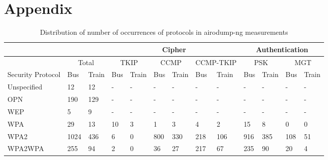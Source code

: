 \documentclass[letterpaper, 10 pt, conference]{ieeeconf}  %
\begin{document}
\section{Appendix}
\begin{center}
  \begin{table} [htbp]
   \centering
    \begin{tabular}{ |l|l|l|l|l|l|l|l|l|l|l|l|l| }
    \hline    
    {} & \multicolumn{2}{|c|}{} & \multicolumn{6}{|c|}{Cipher} & \multicolumn{4}{|c|}{Authentication} \\ \hline
    {} & \multicolumn{2}{|c|}{Total} & \multicolumn{2}{|c|}{TKIP} & \multicolumn{2}{|c|}{CCMP} & \multicolumn{2}{|c|}{CCMP-TKIP} & \multicolumn{2}{|c|}{PSK} & \multicolumn{2}{|c|}{MGT} \\ \hline
    Security Protocol & Bus & Train& Bus & Train & Bus & Train & Bus & Train & Bus & Train & Bus & Train \\ \hline
    Unspecified & 12 & 12 & - & - & - & - & - & - & - & - & - & - \\ \hline
    OPN & 190 & 129 & - & - & - & - & - & - & - & - & - & - \\ \hline
    WEP & 5 & 9 & - & - & - & - & - & - & - & - & - & - \\ \hline    
    WPA & 29 & 13 & 10 & 3 & 1 & 3 & 4 & 2 & 15 & 8 & 0 & 0 \\ \hline
    WPA2 & 1024 & 436 & 6 & 0 & 800 & 330 & 218 & 106 & 916 & 385 & 108 & 51 \\ \hline
    WPA2WPA & 255 & 94 & 2 & 0 & 36 & 27 & 217 & 67 & 235 & 90 & 20 & 4 \\ \hline
    \end{tabular}
    \caption{Distribution of number of occurrences of protocols in airodump-ng measurements}
    \label{tab:measurements}
  \end{table}
\end{center}


\addtolength{\textheight}{-12cm}   %

\end{document}
